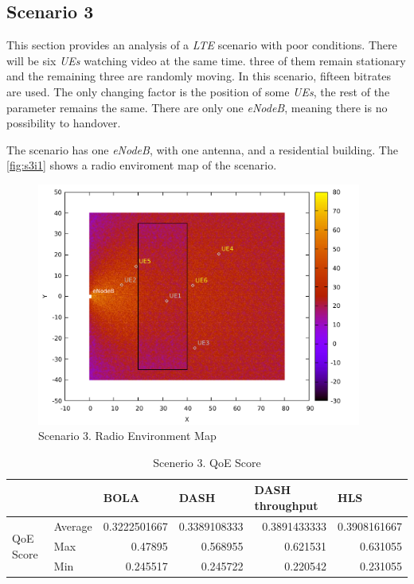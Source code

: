 \subsection{Scenario 3}

This section provides an analysis of a \textit{LTE} scenario with poor conditions. There will be six \textit{UEs} watching video at the same time.
three of them remain stationary and the remaining three are randomly moving.
In this scenario, fifteen bitrates are used.
The only changing factor is the position of some \textit{UEs}, 
the rest of the parameter remains the same. There are only one \textit{eNodeB}, meaning there 
is no possibility to handover.

The scenario has one \textit{eNodeB}, with one antenna, and a residential building. The 
\autoref{fig:s3i1} shows a radio enviroment map of the scenario.

\begin{figure}[h]
    \centering
    \includegraphics[width=0.95\textwidth]{img/s3i1.pdf}
    \caption{Scenario 3. Radio Environment Map}
    \label{fig:s3i1}
\end{figure}

\begin{table}[h]
    \begin{tabular}{@{}llrrrr@{}}
    \toprule
    &         & \multicolumn{1}{l}{BOLA} & \multicolumn{1}{l}{DASH} & \multicolumn{1}{l}{DASH throughput} & \multicolumn{1}{l}{HLS} \\ \midrule
    \multirow{3}{*}{QoE Score} & Average & 0.3222501667             & 0.3389108333             & 0.3891433333                        & 0.3908161667            \\
                               & Max     & 0.47895                  & 0.568955                 & 0.621531                            & 0.631055                \\
                               & Min     & 0.245517                 & 0.245722                 & 0.220542                            & 0.231055                \\ \bottomrule
    \end{tabular}
    \caption{Scenerio 3. QoE Score}
    \label{table:s3t1}
\end{table}

